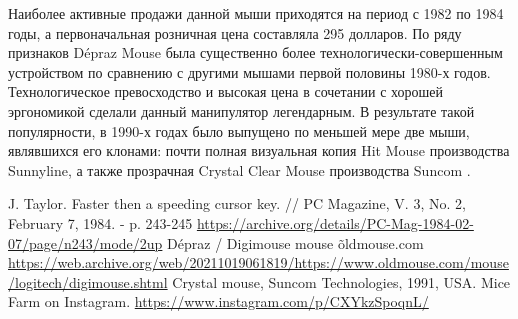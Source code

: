\documentclass[11pt, a4paper]{article}
\begin{document}
Наиболее активные продажи данной мыши приходятся на период с 1982 по 1984 годы, а первоначальная розничная цена составляла 295 долларов. По ряду признаков Dépraz Mouse была существенно более технологически-совершенным устройством по сравнению с другими мышами первой половины 1980-х годов. Технологическое превосходство и высокая цена в сочетании с хорошей эргономикой сделали данный манипулятор легендарным. В результате такой популярности, в 1990-х годах было выпущено по меньшей мере две мыши, являвшихся его клонами: почти полная визуальная копия Hit Mouse производства Sunnyline, а также прозрачная Crystal Clear Mouse производства Suncom \cite{suncom}.

\begin{thebibliography}{9}
 J. Taylor. Faster then a speeding cursor key. // PC Magazine, V. 3, No. 2, February 7, 1984. - p. 243-245 \url{https://archive.org/details/PC-Mag-1984-02-07/page/n243/mode/2up}
 Dépraz / Digimouse mouse \~ oldmouse.com \url{https://web.archive.org/web/20211019061819/https://www.oldmouse.com/mouse/logitech/digimouse.shtml}
 Crystal mouse, Suncom Technologies, 1991, USA. Mice Farm on Instagram. \url{https://www.instagram.com/p/CXYkzSpoqnL/}
\end{thebibliography}
\end{document}

